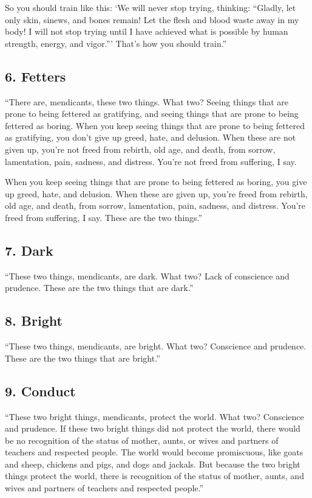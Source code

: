 \documentclass[12pt,openany]{book}%
\begin{document}
So you should train like this: ‘We will never stop trying, thinking: “Gladly, let only skin, sinews, and bones remain! Let the flesh and blood waste away in my body! I will not stop trying until I have achieved what is possible by human strength, energy, and vigor.”’ That’s how you should train.” 

\subsection*{6. Fetters }

“There are, mendicants, these two things. What two? Seeing things that are prone to being fettered as gratifying, and seeing things that are prone to being fettered as boring. When you keep seeing things that are prone to being fettered as gratifying, you don’t give up greed, hate, and delusion. When these are not given up, you’re not freed from rebirth, old age, and death, from sorrow, lamentation, pain, sadness, and distress. You’re not freed from suffering, I say. 

When you keep seeing things that are prone to being fettered as boring, you give up greed, hate, and delusion. When these are given up, you’re freed from rebirth, old age, and death, from sorrow, lamentation, pain, sadness, and distress. You’re freed from suffering, I say. These are the two things.” 

\subsection*{7. Dark }

“These two things, mendicants, are dark. What two? Lack of conscience and prudence. These are the two things that are dark.” 

\subsection*{8. Bright }

“These two things, mendicants, are bright. What two? Conscience and prudence. These are the two things that are bright.” 

\subsection*{9. Conduct }

“These two bright things, mendicants, protect the world. What two? Conscience and prudence. If these two bright things did not protect the world, there would be no recognition of the status of mother, aunts, or wives and partners of teachers and respected people. The world would become promiscuous, like goats and sheep, chickens and pigs, and dogs and jackals. But because the two bright things protect the world, there is recognition of the status of mother, aunts, and wives and partners of teachers and respected people.” 
\end{document}
